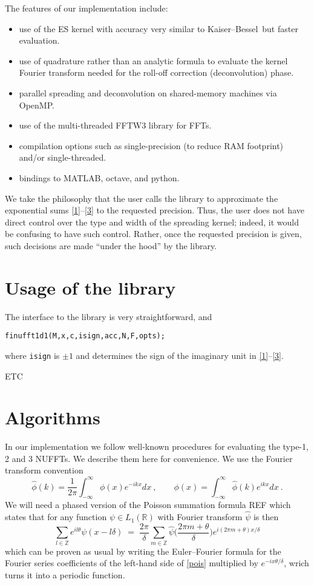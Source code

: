 \documentclass[10pt]{article}
\newcommand{\bi}{\begin{itemize}}
\newcommand{\ei}{\end{itemize}}
\newcommand{\be}{\begin{equation}}
\newcommand{\ee}{\end{equation}}
\newcommand{\RR}{\mathbb{R}}
\newcommand{\ZZ}{\mathbb{Z}}
\newcommand{\intR}{\int_{-\infty}^\infty}
\newcommand{\KB}{Kaiser--Bessel}
\begin{document}
The features of our implementation include:
\bi
\item use of the ES kernel with accuracy very similar to \KB\ but
  faster evaluation.
\item use of quadrature rather than an analytic formula to evaluate
  the kernel Fourier transform needed for the roll-off correction
  (deconvolution) phase.
\item parallel spreading and deconvolution on shared-memory machines via OpenMP.
\item use of the multi-threaded FFTW3 library for FFTs.
\item compilation options such as single-precision (to reduce RAM footprint)
  and/or single-threaded.
\item bindings to MATLAB, octave, and python.
\ei

We take the philosophy that the user calls the library to approximate the
exponential sums \eqref{1}--\eqref{3} to the requested precision.
Thus, the user does not have direct control over the type and width of
the spreading kernel; indeed, it would be confusing to have such control.
Rather, once the requested precision is given, such decisions
are made ``under the hood'' by the library.





\section{Usage of the library}

The interface to the library is very straightforward,
and 


\begin{verbatim}
finufft1d1(M,x,c,isign,acc,N,F,opts);
\end{verbatim}

where {\tt isign} is $\pm1$ and determines the sign of the imaginary
unit in \eqref{1}--\eqref{3}.

ETC



\section{Algorithms}

In our implementation we follow well-known procedures 
for evaluating the type-1, 2 and 3 NUFFTs.
We describe them here for convenience.
We use the Fourier transform convention
\be
\hat\phi(k) = \frac{1}{2\pi} \intR \phi(x) e^{-ikx} dx
~,\qquad
\phi(x) = \intR \hat\phi(k) e^{ikx} dx
~.
\label{ft}
\ee
We will need a
phased version of the Poisson summation formula REF which states that
for any function
$\psi \in L_1(\RR)$ with Fourier transform $\hat\psi$ is then
\be
\sum_{l\in\ZZ} e^{il\theta} \psi(x - l\delta) \; = \;
\frac{2\pi}{\delta} \sum_{m\in\ZZ}
\hat\psi\biggl(\frac{2\pi m + \theta}{\delta}\biggr)
e^{i(2\pi m + \theta)x /\delta}
\label{pois}
\ee
which can be proven as usual by writing the Euler--Fourier
formula for the Fourier series coefficients
of the left-hand side of \eqref{pois} multiplied by $e^{-ix\theta/\delta}$,
wrich turns it into a periodic function.
\end{document}
